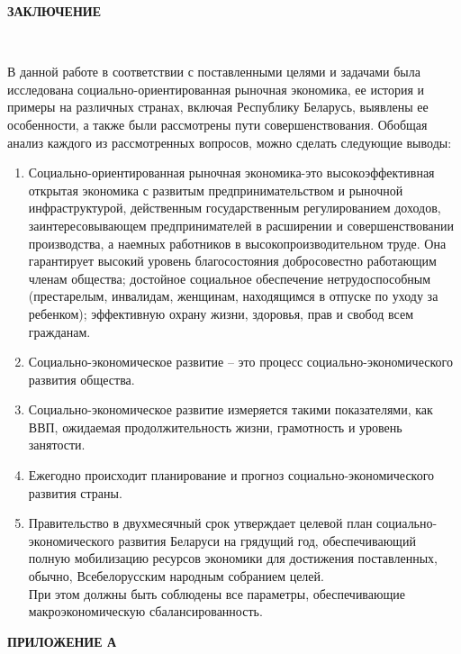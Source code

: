 \documentclass[14pt,a4paper]{article}
\begin{document}
    \newpage
    \begin{center}
        \textbf{\LARGE{ЗАКЛЮЧЕНИЕ}}
    \end{center}
    \\
    \par
    В данной работе в соответствии с поставленными целями и задачами была исследована социально-ориентированная рыночная экономика, ее история и примеры на различных странах, включая Республику Беларусь, выявлены ее особенности, а также были рассмотрены пути совершенствования.
    Обобщая анализ каждого из рассмотренных вопросов, можно сделать следующие выводы:
    \begin{enumerate}
        \item Социально-ориентированная рыночная экономика-это высокоэффективная открытая экономика с развитым предпринимательством и рыночной инфраструктурой, действенным государственным регулированием доходов, заинтересовывающем предпринимателей в расширении и совершенствовании производства, а наемных работников в высокопроизводительном труде. Она гарантирует высокий уровень благосостояния добросовестно работающим членам общества; достойное социальное обеспечение нетрудоспособным (престарелым, инвалидам, женщинам, находящимся в отпуске по уходу за ребенком); эффективную охрану жизни, здоровья, прав и свобод всем гражданам.
        \item Социально-экономическое развитие – это процесс социально-экономического развития общества.
        \item Социально-экономическое развитие измеряется такими показателями, как ВВП, ожидаемая продолжительность жизни, грамотность и уровень занятости.
        \item Ежегодно происходит планирование и прогноз социально-экономического развития страны.
        \item Правительство в двухмесячный срок утверждает целевой план социально-\\экономического развития Беларуси на грядущий год, обеспечивающий полную мобилизацию ресурсов экономики для достижения поставленных, обычно, Всебелорусским народным собранием целей.
        \\
        При этом должны быть соблюдены все параметры, обеспечивающие макроэкономическую сбалансированность.
    \end{enumerate}

    \newpage
    \begin{center}
        \textbf{\LARGE{ПРИЛОЖЕНИЕ А}}
    \end{center}
\end{document}
